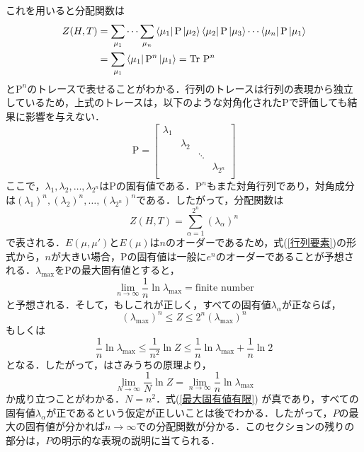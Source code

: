 \documentclass[a4paper,11pt]{jsreport}
\begin{document}
これを用いると分配関数は
\begin{align}
  Z(H,T)
   & = \sum_{\mu_1} \cdots \sum_{\mu_n} \bra{\mu_1} \mathrm{P} \ket{\mu_2}\bra{\mu_2} \mathrm{P} \ket{\mu_3}\cdots\bra{\mu_n} \mathrm{P} \ket{\mu_1} \\
   & = \sum_{\mu_1}\bra{\mu_1} \mathrm{P}^n \ket{\mu_1} = \mathrm{Tr} \ \mathrm{P}^n
\end{align}
と$\mathrm{P}^n$のトレースで表せることがわかる．行列のトレースは行列の表現から独立しているため，上式のトレースは，以下のような対角化された$\mathrm{P}$で評価しても結果に影響を与えない．
\begin{equation}
  \mathrm{P} = \begin{bmatrix}
    \lambda_1 &           &        &               \\
              & \lambda_2 &        &               \\
              &           & \ddots &               \\
              &           &        & \lambda_{2^n} \\
  \end{bmatrix}
\end{equation}
ここで，$\lambda_1, \lambda_2, \dots, \lambda_{2^n}$は$\mathrm{P}$の固有値である．$\mathrm{P}^n$もまた対角行列であり，対角成分は$(\lambda_1)^n, (\lambda_2)^n, \dots, (\lambda_{2^n})^n$である．したがって，分配関数は
\begin{equation}
  Z(H,T)
  = \sum_{\alpha=1}^{2^n} (\lambda_\alpha)^n
\end{equation}
で表される．$E(\mu, \mu')$と$E(\mu)$は$n$のオーダーであるため，式(\ref{行列要素})の形式から，$n$が大きい場合，$\mathrm{P}$の固有値は一般に$e^n$のオーダーであることが予想される．$\lambda_{\text{max}}$を$\mathrm{P}$の最大固有値とすると，
\begin{equation}
  \lim_{n \rightarrow \infty} \frac{1}{n} \ln{\lambda}_{\text{max}}
  = \text{finite number}
  \label{最大固有値有限}
\end{equation}
と予想される．そして，もしこれが正しく，すべての固有値$\lambda_{\alpha}$が正ならば，
\begin{equation}
  (\lambda_{\text{max}})^n \leq Z \leq 2^n (\lambda_{\max})^n
\end{equation}
もしくは
\begin{equation}
  \frac{1}{n}\ln{\lambda_{\text{max}}}
  \leq \frac{1}{n^2}\ln{Z}
  \leq \frac{1}{n}\ln{\lambda_{\text{max}}} + \frac{1}{n} \ln{2}
\end{equation}
となる．したがって，はさみうちの原理より，
\begin{equation}
  \lim_{N \rightarrow \infty} \frac{1}{N} \ln{Z}
  = \lim_{n \rightarrow \infty} \frac{1}{n} \ln{\lambda_{\text{max}}}
  \label{n極限}
\end{equation}
か成り立つことがわかる．$N=n^2$．式(\ref{最大固有値有限}) が真であり，すべての固有値$\lambda_{\alpha}$が正であるという仮定が正しいことは後でわかる．したがって，$P$の最大の固有値が分かれば$n \rightarrow \infty$での分配関数が分かる．このセクションの残りの部分は，$P$の明示的な表現の説明に当てられる．
\end{document}

